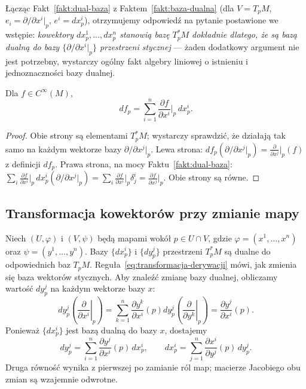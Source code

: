 Łącząc Fakt~\ref{fakt:dual-baza} z Faktem~\ref{fakt:baza-dualna} (dla $V=T_pM$, $e_i=
\partial/\partial x^i|_p$, $e^i=dx^i_p$), otrzymujemy odpowiedź na pytanie postawione we
wstępie: \emph{kowektory $dx^1_p,\dots,dx^n_p$ stanowią bazę $T_p^*M$ dokładnie dlatego, że
są bazą dualną do bazy $\{\partial/\partial x^i|_p\}$ przestrzeni stycznej} — żaden
dodatkowy argument nie jest potrzebny, wystarczy ogólny fakt algebry liniowej o istnieniu
i jednoznaczności bazy dualnej.

\begin{stwierdzenie}
Dla $f\in C^\infty(M)$,
\[
df_p=\sum_{i=1}^n\frac{\partial f}{\partial x^i}\Big|_p\,dx^i_p.
\]
\end{stwierdzenie}
\begin{proof}
Obie strony są elementami $T_p^*M$; wystarczy sprawdzić, że działają tak samo na każdym
wektorze bazy $\partial/\partial x^j|_p$. Lewa strona: $df_p(\partial/\partial x^j|_p)=
\frac{\partial}{\partial x^j}\big|_p(f)$ z definicji $df_p$. Prawa strona, na mocy
Faktu~\ref{fakt:dual-baza}: $\sum_i\frac{\partial f}{\partial x^i}\big|_p\,dx^i_p
(\partial/\partial x^j|_p)=\sum_i\frac{\partial f}{\partial x^i}\Big|_p\delta^i_j=
\frac{\partial f}{\partial x^j}\Big|_p$. Obie strony są równe.
\end{proof}
\subsection*{Transformacja kowektorów przy zmianie mapy}

Niech $(U,\varphi)$ i $(V,\psi)$ będą mapami wokół
$p\in U\cap V$, gdzie $\varphi=(x^1,\ldots,x^n)$ oraz
$\psi=(y^1,\ldots,y^n)$. Bazy $\{dx^i_p\}$ i $\{dy^j_p\}$
przestrzeni $T_p^*M$ są dualne do odpowiednich baz $T_pM$.
Reguła~\eqref{eq:transformacja-derywacji} mówi, jak zmienia się
baza wektorów stycznych. Aby znaleźć zmianę bazy dualnej,
obliczamy wartość $dy^j_p$ na każdym wektorze bazy $x$:
\[
dy^j_p\left(\left.\frac{\partial}{\partial x^i}\right|_p\right)
=\sum_{k=1}^n\frac{\partial y^k}{\partial x^i}(p)
dy^j_p\left(\left.\frac{\partial}{\partial y^k}\right|_p\right)
=\frac{\partial y^j}{\partial x^i}(p).
\]
Ponieważ $\{dx^i_p\}$ jest bazą dualną do bazy $x$, dostajemy
\begin{equation}\label{eq:transformacja-kowektorow}
\boxed{\quad
dy^j_p=\sum_{i=1}^n\frac{\partial y^j}{\partial x^i}(p)\,dx^i_p,
\qquad
dx^i_p=\sum_{j=1}^n\frac{\partial x^i}{\partial y^j}(p)\,dy^j_p.
\quad}
\end{equation}
Druga równość wynika z pierwszej po zamianie ról map;
macierze Jacobiego obu zmian są wzajemnie odwrotne.

